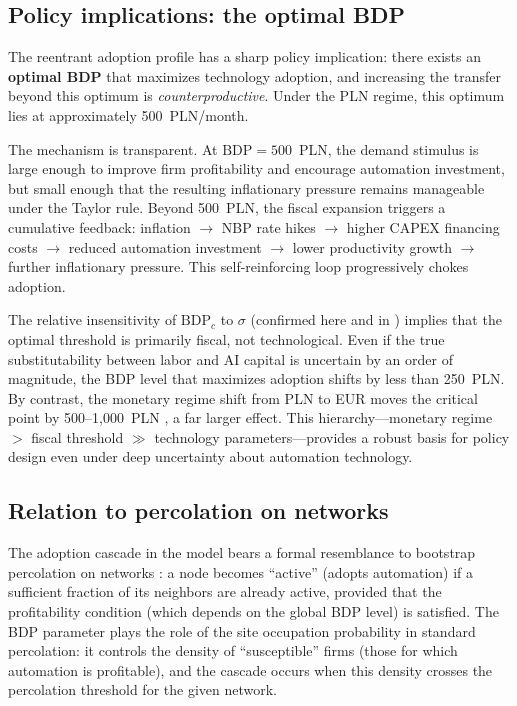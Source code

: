 \documentclass[12pt,a4paper]{article}
\begin{document}
\subsection{Policy implications: the optimal BDP}
\label{sec:policy}

The reentrant adoption profile has a sharp policy implication: there exists an
\textbf{optimal BDP} that maximizes technology adoption, and increasing the
transfer beyond this optimum is \emph{counterproductive}. Under the PLN regime,
this optimum lies at approximately 500~PLN/month.

The mechanism is transparent. At $\mathrm{BDP} = 500$~PLN, the demand stimulus
is large enough to improve firm profitability and encourage automation
investment, but small enough that the resulting inflationary pressure remains
manageable under the Taylor rule. Beyond 500~PLN, the fiscal expansion
triggers a cumulative feedback: inflation $\to$ NBP rate hikes $\to$ higher
CAPEX financing costs $\to$ reduced automation investment $\to$ lower
productivity growth $\to$ further inflationary pressure. This self-reinforcing
loop progressively chokes adoption.

The relative insensitivity of $\mathrm{BDP}_c$ to $\sigma$ (confirmed here and
in \textcite{Maciaszek2026c}) implies that the optimal threshold is
primarily fiscal, not technological. Even if the true substitutability between
labor and AI capital is uncertain by an order of magnitude, the BDP level that
maximizes adoption shifts by less than 250~PLN. By contrast, the monetary
regime shift from PLN to EUR moves the critical point by
500--1{,}000~PLN \parencite{Maciaszek2026b}, a far larger effect. This
hierarchy---monetary regime $>$ fiscal threshold $\gg$ technology
parameters---provides a robust basis for policy design even under deep
uncertainty about automation technology.

\subsection{Relation to percolation on networks}

The adoption cascade in the model bears a formal resemblance to bootstrap
percolation on networks \parencite{Newman2003}: a node becomes ``active''
(adopts automation) if a sufficient fraction of its neighbors are already
active, provided that the profitability condition (which depends on the global
BDP level) is satisfied. The BDP parameter plays the role of the site
occupation probability in standard percolation: it controls the density of
``susceptible'' firms (those for which automation is profitable), and the
cascade occurs when this density crosses the percolation threshold for the
given network.
\end{document}
